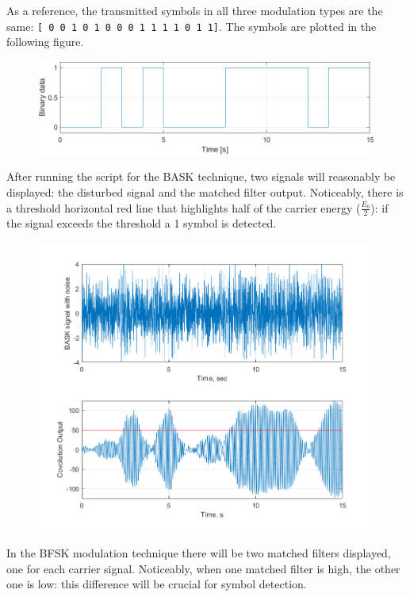 \noindent As a reference, the transmitted symbols in all three modulation types are the same: \texttt{[ 0 0 1 0 1 0 0 0 1 1 1 1 0 1 1]}. The symbols are plotted in the following figure.

\begin{figure}[h!]
    \centering
    \includegraphics[width = .7\textwidth]{lab-5/imgs/initial-data.png}
\end{figure}

\FloatBarrier\noindent After running the script for the BASK technique, two signals will reasonably be displayed: the disturbed signal and the matched filter output. Noticeably, there is a threshold horizontal red line that highlights half of the carrier energy ($\frac{E_b}{2}$): if the signal exceeds the threshold a 1 symbol is detected.

\begin{figure}[h!]
    \centering
    \includegraphics[width = .7\textwidth]{lab-5/imgs/BASK.png}
\end{figure}

\FloatBarrier\noindent In the BFSK modulation technique there will be two matched filters displayed, one for each carrier signal. Noticeably, when one matched filter is high, the other one is low: this difference will be crucial for symbol detection.

